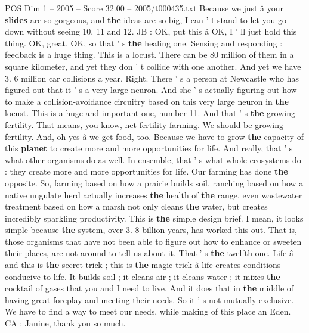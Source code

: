 \begin{textsample}{POS Dim 1 – 2005 – Score 32.00 – 2005/t000435.txt}
Because we just â your \textbf{slides} are so gorgeous, and \textbf{the} ideas are so big, I can ' t stand to let you go down without seeing 10, 11 and 12.
JB : OK, put this â OK, I ' ll just hold this thing.
OK, great.
OK, so that ' s \textbf{the} healing one.
Sensing and responding : feedback is a huge thing.
This is a locust.
There can be 80 million of them in a square kilometer, and yet they don ' t collide with one another.
And yet we have 3. 6 million car collisions a year.
Right.
There ' s a person at Newcastle who has figured out that it ' s a very large neuron.
And she ' s actually figuring out how to make a collision-avoidance circuitry based on this very large neuron in \textbf{the} locust.
This is a huge and important one, number 11.
And that ' s \textbf{the} growing fertility.
That means, you know, net fertility farming.
We should be growing fertility.
And, oh yes â we get food, too.
Because we have to grow \textbf{the} capacity of this \textbf{planet} to create more and more opportunities for life.
And really, that ' s what other organisms do as well.
In ensemble, that ' s what whole ecosystems do : they create more and more opportunities for life.
Our farming has done \textbf{the} opposite.
So, farming based on how a prairie builds soil, ranching based on how a native ungulate herd actually increases \textbf{the} health of \textbf{the} range, even wastewater treatment based on how a marsh not only cleans \textbf{the} water, but creates incredibly sparkling productivity.
This is \textbf{the} simple design brief.
I mean, it looks simple because \textbf{the} system, over 3. 8 billion years, has worked this out.
That is, those organisms that have not been able to figure out how to enhance or sweeten their places, are not around to tell us about it.
That ' s \textbf{the} twelfth one.
Life â and this is \textbf{the} secret trick ; this is \textbf{the} magic trick â life creates conditions conducive to life.
It builds soil ; it cleans air ; it cleans water ; it mixes \textbf{the} cocktail of gases that you and I need to live.
And it does that in \textbf{the} middle of having great foreplay and meeting their needs.
So it ' s not mutually exclusive.
We have to find a way to meet our needs, while making of this place an Eden.
CA : Janine, thank you so much.

\end{textsample}
